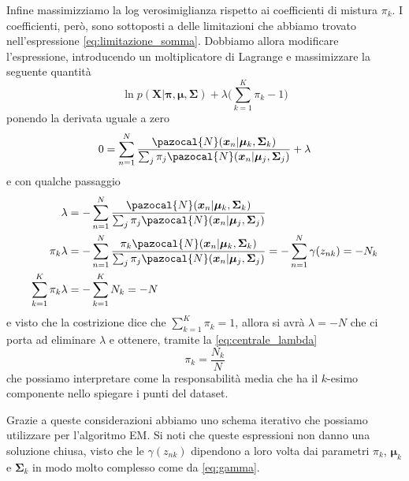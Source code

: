 \documentclass{report}
\begin{document}
Infine massimizziamo la log verosimiglianza rispetto ai coefficienti di mistura $\pi_k$. I coefficienti, però, sono sottoposti a delle limitazioni che abbiamo trovato nell'espressione \eqref{eq:limitazione_somma}. Dobbiamo allora modificare l'espressione, introducendo un moltiplicatore di Lagrange e massimizzare la seguente quantità
\begin{equation}
\ln p(\bm{X}|\bm\pi,\bm\mu,\bm\Sigma) + \lambda\Bigg(\sum_{k=1}^K\pi_k - 1\Bigg)
\end{equation}
ponendo la derivata uguale a zero
\begin{equation}
0 = \sum_{n=1}^N\frac{\pazocal{N}(\bm{x}_n|\bm\mu_k,\bm\Sigma_k)}{\sum_j \pi_j\pazocal{N}(\bm{x}_n|\bm\mu_j, \bm\Sigma_j)} + \lambda
\end{equation}
e con qualche passaggio
\begin{equation}\label{eq:centrale_lambda}
\begin{aligned}
\lambda &= -\sum_{n=1}^N\frac{\pazocal{N}(\bm{x}_n|\bm\mu_k,\bm\Sigma_k)}{\sum_j \pi_j\pazocal{N}(\bm{x}_n|\bm\mu_j, \bm\Sigma_j)}\\
\pi_k\lambda &= -\sum_{n=1}^N\frac{\pi_k\pazocal{N}(\bm{x}_n|\bm\mu_k,\bm\Sigma_k)}{\sum_j \pi_j\pazocal{N}(\bm{x}_n|\bm\mu_j, \bm\Sigma_j)} = -\sum_{n=1}^N\gamma(z_{nk}) = -N_k\\
\sum_{k=1}^K\pi_k\lambda &= -\sum_{k=1}^K N_k = -N
\end{aligned}
\end{equation}
e visto che la costrizione dice che $\sum_{k=1}^K\pi_k = 1$, allora si avrà $\lambda = -N$ che ci porta ad eliminare $\lambda$ e ottenere, tramite la \eqref{eq:centrale_lambda}
\begin{equation}
\pi_k = \frac{N_k}{N}
\end{equation}
che possiamo interpretare come la responsabilità media che ha il $k$-esimo componente nello spiegare i punti del dataset.

Grazie a queste considerazioni abbiamo uno schema iterativo che possiamo utilizzare per l'algoritmo EM. Si noti che queste espressioni non danno una soluzione chiusa, visto che le $\gamma(z_{nk})$ dipendono a loro volta dai parametri $\pi_k$, $\bm\mu_k$ e $\bm\Sigma_k$ in modo molto complesso come da \eqref{eq:gamma}.
\end{document}
